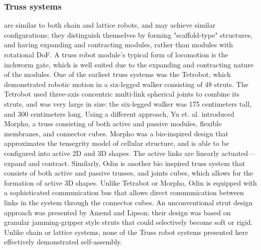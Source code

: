 \documentclass[letterpaper, 10 pt, conference]{ieeeconf}  %
\begin{document}
\subsubsection{Truss systems} are similar to both chain and lattice robots, and may achieve similar configurations; they distinguish themselves by forming "scaffold-type" structures, and having expanding and contracting modules, rather than modules with rotational DoF\cite{Gilpin2010}. A truss robot module's typical form of locomotion is the inchworm gate, which is well suited due to the expanding and contracting nature of the modules. One of the earliest truss systems was the Tetrobot, which demonstrated robotic motion in a six-legged walker consisting of 48 struts\cite{Hamlin1995}. The Tetrobot used three-axis concentric multi-link spherical joints to combine its struts, and was very large in size: the six-legged walker was 175 centimeters tall, and 300 centimeters long\cite{Hamlin1995}. Using a different approach, Yu et. al. introduced Morpho, a truss consisting of both active and passive modules, flexible membranes, and connector cubes\cite{Chih-HanYu2008}. Morpho was a bio-inspired design that approximates the tensegrity model of cellular structure, and is able to be configured into active 2D and 3D shapes. The active links are linearly actuated---expand and contract. Similarly, Odin is another bio inspired truss system that consists of both active and passive trusses, and joints cubes, which allows for the formation of active 3D shapes\cite{Lyder2008}. Unlike Tetrabot or Morpho, Odin is equipped with a sophisticated communication bus that allows direct communication between links in the system through the connector cubes\cite{Garcia2009}. An unconventional strut design approach was presented by Amend and Lipson; their design was based on granular jamming-gripper style struts that could selectively become soft or rigid\cite{Amend2009}. Unlike chain or lattice systems, none of the Truss robot systems presented here effectively demonstrated self-assembly.
\end{document}

